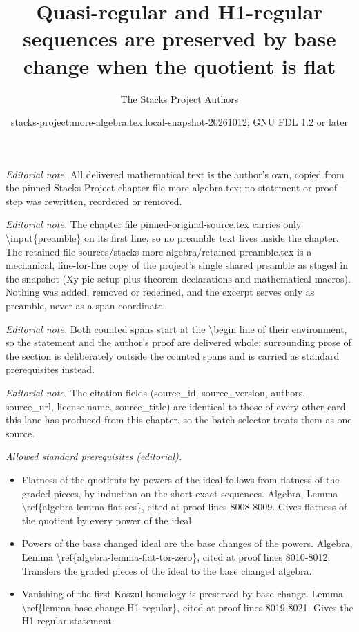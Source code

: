 \documentclass[10pt,a4paper]{amsart}
\title{Quasi-regular and H1-regular sequences are preserved by base change when the quotient is flat}
\author{The Stacks Project Authors}
\date{stacks-project:more-algebra.tex:local-snapshot-20261012; GNU FDL 1.2 or later}
\theoremstyle{plain}
\theoremstyle{definition}
\theoremstyle{remark}
\numberwithin{equation}{subsection}
\begin{document}
\maketitle
\setcounter{subsection}{1}
\noindent\textit{Editorial note.} All delivered mathematical text is the author's own, copied from the pinned Stacks Project chapter file more-algebra.tex; no statement or proof step was rewritten, reordered or removed.\par\medskip
\noindent\textit{Editorial note.} The chapter file pinned-original-source.tex carries only \textbackslash{}input\{preamble\} on its first line, so no preamble text lives inside the chapter. The retained file sources/stacks-more-algebra/retained-preamble.tex is a mechanical, line-for-line copy of the project's single shared preamble as staged in the snapshot (Xy-pic setup plus theorem declarations and mathematical macros). Nothing was added, removed or redefined, and the excerpt serves only as preamble, never as a span coordinate.\par\medskip
\noindent\textit{Editorial note.} Both counted spans start at the \textbackslash{}begin line of their environment, so the statement and the author's proof are delivered whole; surrounding prose of the section is deliberately outside the counted spans and is carried as standard prerequisites instead.\par\medskip
\noindent\textit{Editorial note.} The citation fields (source\_id, source\_version, authors, source\_url, license.name, source\_title) are identical to those of every other card this lane has produced from this chapter, so the batch selector treats them as one source.\par\medskip
\noindent\textit{Allowed standard prerequisites (editorial).}\begin{itemize}
\item Flatness of the quotients by powers of the ideal follows from flatness of the graded pieces, by induction on the short exact sequences. Algebra, Lemma \textbackslash{}ref\{algebra-lemma-flat-ses\}, cited at proof lines 8008-8009. Gives flatness of the quotient by every power of the ideal.
\item Powers of the base changed ideal are the base changes of the powers. Algebra, Lemma \textbackslash{}ref\{algebra-lemma-flat-tor-zero\}, cited at proof lines 8010-8012. Transfers the graded pieces of the ideal to the base changed algebra.
\item Vanishing of the first Koszul homology is preserved by base change. Lemma \textbackslash{}ref\{lemma-base-change-H1-regular\}, cited at proof lines 8019-8021. Gives the H1-regular statement.
\end{itemize}\medskip
\end{document}
